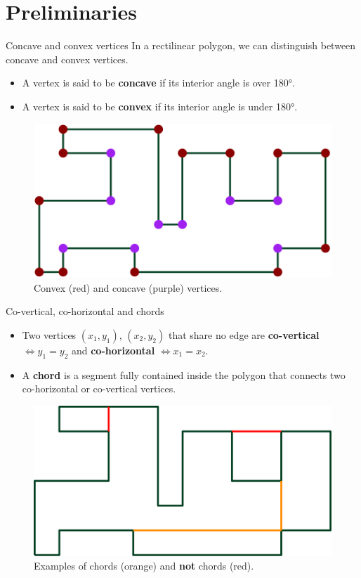 \documentclass{beamer}
\begin{document}
\section{Preliminaries}

\begin{frame}[t]{Concave and convex vertices}
	In a rectilinear polygon, we can distinguish between concave and convex vertices.
	
    \begin{itemize}
        \item A vertex is said to be \textcolor{concave}{\textbf{concave}} if its interior angle is over 180°.
        \item A vertex is said to be \textcolor{convex}{\textbf{convex}} if its interior angle is under 180°.
    \end{itemize}
    \vspace{10px}
\begin{figure}
\centering
  \includegraphics[width=.6\textwidth]{"./concave.png"}
  \caption{Convex (red) and concave (purple) vertices.}
     \label{fig:question}
\end{figure}

\end{frame}

\begin{frame}[t]{Co-vertical, co-horizontal and chords}	
    \begin{itemize}
        \item Two vertices $(x_1, y_1)$, $(x_2, y_2)$ that share no edge are \textbf{co-vertical} $\iff y_1 = y_2$ and \textbf{co-horizontal} $\iff x_1 = x_2$. 
        \item A \textbf{chord} is a segment fully contained inside the polygon that connects two co-horizontal or co-vertical vertices.
    \end{itemize}
    \vspace{10px}
\begin{figure}
\centering
  \includegraphics[width=.6\textwidth]{"./chords.png"}
  \caption{Examples of chords (orange) and \textbf{not} chords (red).}
     \label{fig:question}
\end{figure}

\end{frame}
\end{document}
